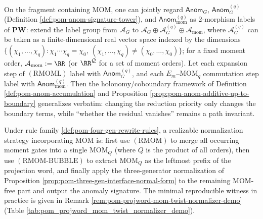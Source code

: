 \begin{remark}\label{rem:pom-anom-cohomology-mom}
On the fragment containing \(\mathrm{MOM}\), one can jointly regard \(\mathsf{Anom}_G\), \(\mathsf{Anom}^{(q)}_{G}\) (Definition \ref{def:pom-anom-signature-tower}), and \(\mathsf{Anom}^{(q)}_{\mathrm{mom}}\) as \(2\)-morphism labels of \(\mathbf{PW}\):
extend the label group from \(\mathcal{A}_G\) to
\(
\mathcal{A}_G\oplus\mathcal{A}^{(q)}_{G}\oplus\mathcal{A}_{\mathrm{mom}}
\),
where \(\mathcal{A}^{(q)}_{G}\) can be taken as a finite-dimensional real vector space indexed by the dimensions \(\{(\chi_1,\dots,\chi_q):\chi_1\cdots\chi_q=\chi_0,\ (\chi_1,\dots,\chi_q)\neq(\chi_0,\dots,\chi_0)\}\); for a fixed moment order, \(\mathcal{A}_{\mathrm{mom}}:=\RR\) (or \(\RR^{\mathcal{Q}}\) for a set of moment orders).
Let each expansion step of \((\mathrm{RMOML})\) label with \(\mathsf{Anom}^{(q)}_{G}\), and each \(E_m\)--\(\mathrm{MOM}_q\) commutation step label with \(\mathsf{Anom}^{(q)}_{\mathrm{mom}}\).
Then the holonomy/coboundary framework of Definition \ref{def:pom-anom-accumulation} and Proposition \ref{prop:pom-anom-additive-up-to-boundary} generalizes verbatim: changing the reduction priority only changes the boundary terms, while ``whether the residual vanishes'' remains a path invariant.
\end{remark}

\begin{remark}\label{rem:pom-mom-normalize-strategy}
Under rule family \ref{def:pom-four-gen-rewrite-rules}, a realizable normalization strategy incorporating \(\mathrm{MOM}\) is:
first use \((\mathrm{RMOM})\) to merge all occurring moment gates into a single \(\mathrm{MOM}_Q\) (where \(Q\) is the product of all orders),
then use \((\mathrm{RMOM\text{-}BUBBLE})\) to extract \(\mathrm{MOM}_Q\) as the leftmost prefix of the projection word,
and finally apply the three-generator normalization of Proposition \ref{prop:pom-three-gen-interface-normal-form} to the remaining \(\mathrm{MOM}\)-free part and output the anomaly signature.
The minimal reproducible witness in practice is given in Remark \ref{rem:pom-projword-mom-twist-normalizer-demo} (Table \ref{tab:pom_projword_mom_twist_normalizer_demo}).
\end{remark}

